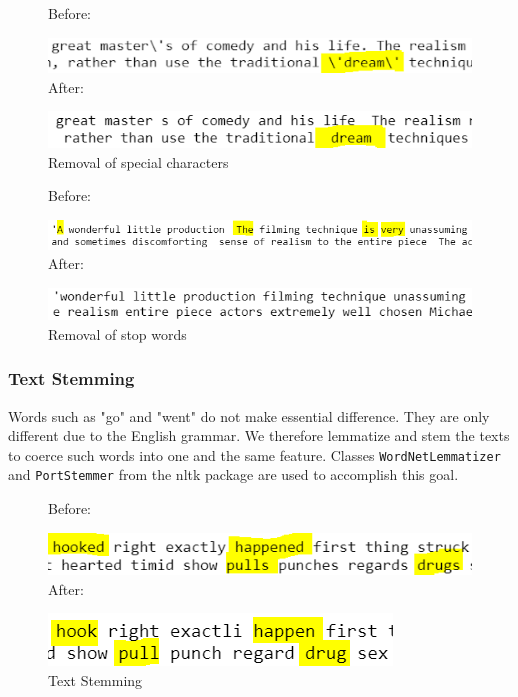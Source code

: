\documentclass[10pt,twocolumn,letterpaper]{article}
\begin{document}
	\begin{figure}[H]
		\textsf{Before:}
		
		\includegraphics[width = \columnwidth]{special_char}
		\textsf{After:}
		
		\includegraphics[width = \columnwidth]{special_char_removed}
		\caption{Removal of special characters}\label{nltk2}
	\end{figure}
	
	\begin{figure}[H]
		\textsf{Before:}
		
		\includegraphics[width = \columnwidth]{stop_words}
		\textsf{After:}
		
		\includegraphics[width = \columnwidth]{stop_words_removed}
		\caption{Removal of stop words}\label{nltk3}
	\end{figure}
	\subsubsection{Text Stemming}
	Words such as "go" and "went" do not make essential difference. They are only different due to the English grammar. We therefore lemmatize and stem the texts to coerce such words into one and the same feature. Classes \texttt{WordNetLemmatizer} and \texttt{PortStemmer} from the nltk package are used to accomplish this goal.
	\begin{figure}[H]
		\textsf{Before:}
		
		\includegraphics[width = \columnwidth]{stem}
		\textsf{After:}
		
		\includegraphics[width = \columnwidth]{after_stem}
		\caption{Text Stemming}
	\end{figure}
	
\end{document}
